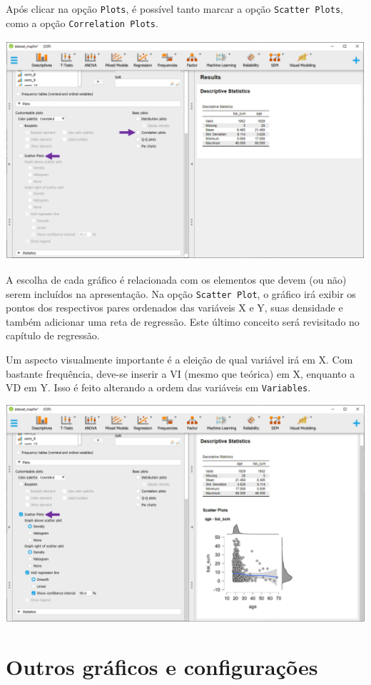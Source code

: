 \documentclass[
]{book}
\begin{document}
Após clicar na opção \texttt{Plots}, é possível tanto marcar a opção \texttt{Scatter\ Plots}, como a opção \texttt{Correlation\ Plots}.

\includegraphics{./img/cap_desc_jasp_grafico_scatter2.png}

A escolha de cada gráfico é relacionada com os elementos que devem (ou não) serem incluídos na apresentação. Na opção \texttt{Scatter\ Plot}, o gráfico irá exibir os pontos dos respectivos pares ordenados das variáveis X e Y, suas densidade e também adicionar uma reta de regressão. Este último conceito será revisitado no capítulo de regressão.

Um aspecto visualmente importante é a eleição de qual variável irá em X. Com bastante frequência, deve-se inserir a VI (mesmo que teórica) em X, enquanto a VD em Y. Isso é feito alterando a ordem das variáveis em \texttt{Variables}.

\includegraphics{./img/cap_desc_jasp_grafico_scatter3.png}

\hypertarget{outros-gruxe1ficos-e-configurauxe7uxf5es-1}{%
\section{Outros gráficos e configurações}\label{outros-gruxe1ficos-e-configurauxe7uxf5es-1}}
\end{document}
